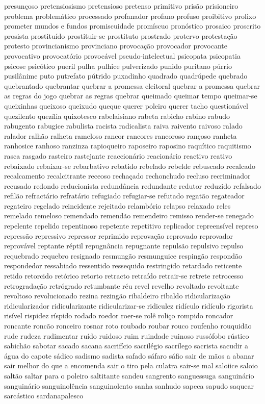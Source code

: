 \begin{appendices}
presun\c{c}oso pretensiosismo pretensioso pretenso primitivo pris\~ao prisioneiro problema problem\'{a}tico processado profanador profano profuso proibitivo prolixo prometer mundos e fundos promiscuidade prom\'{i}scuo pron\'{o}stico prosaico proscrito prosista prostitu\'{i}do prostituir-se prostituto prostrado protervo protesta\c{c}\~ao protesto provincianismo provinciano provoca\c{c}\~ao provocador provocante provocativo provocat\'{o}rio provoc\'{a}vel pseudo-intelectual psicopata psicopatia psicose psic\'{o}tico pueril pulha pulhice pulverizado punido puritano p\'{u}rrio pusil\^{a}nime puto putrefato p\'{u}trido puxadinho quadrado quadr\'{u}pede quebrado quebrantado quebrantar quebrar a promessa eleitoral quebrar a promessa quebrar as regras do jogo quebrar as regras quebrar queimado queimar tempo queimar-se queixinhas queixoso queixudo queque querer poleiro querer tacho question\'{a}vel quezilento quez\'{i}lia quixotesco rabelaisiano rabeta rabicho rabino rabudo rabugento rabugice rabulista racista radicalista raiva raivento raivoso ralado ralador ralh\~ao ralheta rameloso rancor rancores rancoroso ran\c{c}oso ranheta ranhosice ranhoso ranzinza rapioqueiro raposeiro raposino raqu\'{i}tico raquitismo rasca rasgado rasteiro rastejante reaccion\'{a}rio reacion\'{a}rio reactivo reativo rebaixado rebaixar-se rebarbativo rebatido rebelado rebelde rebuscado recalcado recalcamento recalcitrante receoso recha\c{c}ado rechonchudo recluso recriminador recusado redondo reducionista redund\^{a}ncia redundante redutor reduzido refalsado refil\~ao refract\'{a}rio refrat\'{a}rio refugiado refugiar-se refutado regat\~ao regateador regateiro regelado reincidente rejeitado relamb\'{o}rio relapso relaxado reles remelado remeloso remendado remend\~ao remendeiro remisso render-se renegado repelente repelido repentinoso repetente repetitivo replicador repreens\'{i}vel represo repress\~ao repressivo repressor reprimido reprova\c{c}\~ao reprovado reprovador reprov\'{a}vel reptante r\'{e}ptil repugn\^{a}ncia repugnante repuls\~ao repulsivo repulso requebrado requebro resignado resmung\~ao resmunguice resping\~ao respond\~ao respondedor ressabiado ressentido ressequido restringido retardado reticente retido retorcido ret\'{o}rico retorto retracto retra\'{i}do retrair-se retrete retrocesso retrograda\c{c}\~ao retr\'{o}grado retumbante r\'{e}u revel revelho revoltado revoltante revoltoso revolucionado rezina rezing\~ao ribaldeiro ribaldo ridiculariza\c{c}\~ao ridicularizador ridicularizante ridicularizar-se ridiculez rid\'{i}culo rid\'{i}culo rigorista ris\'{i}vel rispidez r\'{i}spido rodado roedor roer-se rol\^{e} roli\c{c}o rompido roncador roncante ronc\~ao ronceiro rosnar roto roubado roubar rouco roufenho rouquid\~ao rude rudeza rudimentar ru\'{i}do ruidoso ruim ruindade ruinoso russ\'{o}fobo r\'{u}stico sabich\~ao sabotar sacado sacana sacrif\'{i}cio sacril\'{e}gio sacr\'{i}lego sacrista sacudir a \'{a}gua do capote s\'{a}dico sadismo sadista safado s\'{a}faro s\'{a}fio sair de m\~aos a abanar sair melhor do que a encomenda sair o tiro pela culatra sair-se mal saloiice saloio salt\~ao saltar para o poleiro saltitante sandeu sangrento sanguessuga sanguin\'{a}rio sanguin\'{a}rio sanguinol\^{e}ncia sanguinolento sanha sanhudo sapeca sapudo saquear sarc\'{a}stico sardanapalesco 
\end{appendices}
